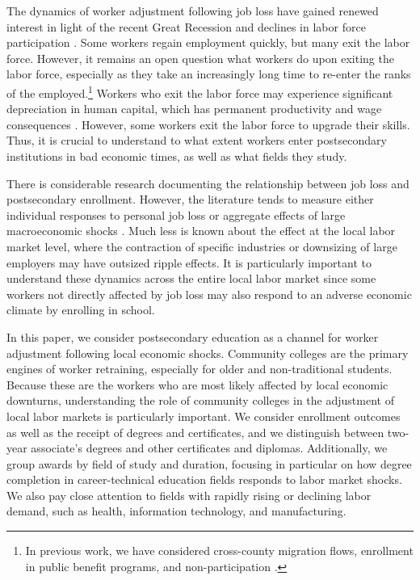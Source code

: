  The dynamics of worker adjustment following job loss have gained renewed interest in light of the recent Great Recession and  declines in labor force participation \citep{wh2016}. Some workers  regain employment quickly, but many exit the  labor force. However, it remains an open question what workers do upon exiting the labor force, especially as they take an increasingly long time to re-enter the ranks of the employed.\footnote{In previous work, we have considered cross-county migration flows, enrollment in public benefit programs, and non-participation \citep{FGS2015}.} Workers who exit the labor force may experience significant depreciation in human capital, which has permanent productivity and wage consequences \citep{AES1999,GdG2009}. However, some workers exit the labor force to upgrade their skills.  Thus, it is crucial to understand to what extent workers enter postsecondary institutions in bad economic times, as well as what fields they study.
 
There is considerable research documenting the relationship between job loss and postsecondary enrollment. However, the literature tends to measure either individual responses to personal job loss \citep[e.g.][]{BT2015} or aggregate effects of large macroeconomic shocks \citep[e.g.][]{BD2012}. Much less is known about the effect at the local labor market level, where the contraction of specific industries or downsizing of large employers may have outsized ripple effects. It is particularly important to understand these dynamics across the entire local labor market since some workers not directly affected by job loss may also respond to an adverse economic climate by enrolling in school.

In this paper, we consider postsecondary education as a channel for worker adjustment following local economic shocks. Community colleges are the primary engines of worker retraining, especially for older and non-traditional students. Because these are the workers who are most likely affected by local economic downturns, understanding the role of community colleges in the adjustment of local labor markets is particularly important. We consider  enrollment outcomes as well as the receipt of degrees and certificates, and we distinguish between two-year associate's degrees and other certificates and diplomas. Additionally, we group awards by field of study and duration, focusing in particular on how degree completion in career-technical education fields responds to labor market shocks. We also pay close attention to fields with rapidly rising or declining labor demand, such as  health, information technology, and manufacturing. 


